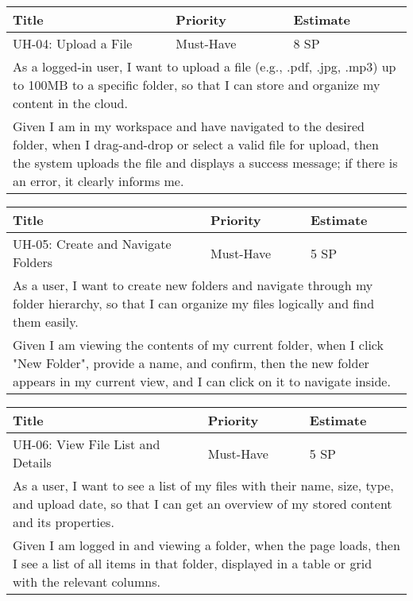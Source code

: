 \vspace{5mm}
\begin{tabular}{|p{4cm}|p{5cm}|p{5cm}|}
    \hline
    \textbf{Title} & \textbf{Priority} & \textbf{Estimate} \\
    \hline
    UH-04: Upload a File & Must-Have & 8 SP \\
    \hline
    \multicolumn{3}{|p{14cm}|}{As a logged-in user, I want to upload a file (e.g., .pdf, .jpg, .mp3) up to 100MB to a specific folder, so that I can store and organize my content in the cloud.} \\
    \hline
    \multicolumn{3}{|p{14cm}|}{Given I am in my workspace and have navigated to the desired folder, when I drag-and-drop or select a valid file for upload, then the system uploads the file and displays a success message; if there is an error, it clearly informs me.} \\
    \hline
\end{tabular}

\vspace{5mm}
\begin{tabular}{|p{4cm}|p{5cm}|p{5cm}|}
    \hline
    \textbf{Title} & \textbf{Priority} & \textbf{Estimate} \\
    \hline
    UH-05: Create and Navigate Folders & Must-Have & 5 SP \\
    \hline
    \multicolumn{3}{|p{14cm}|}{As a user, I want to create new folders and navigate through my folder hierarchy, so that I can organize my files logically and find them easily.} \\
    \hline
    \multicolumn{3}{|p{14cm}|}{Given I am viewing the contents of my current folder, when I click "New Folder", provide a name, and confirm, then the new folder appears in my current view, and I can click on it to navigate inside.} \\
    \hline
\end{tabular}

\vspace{5mm}
\begin{tabular}{|p{4cm}|p{5cm}|p{5cm}|}
    \hline
    \textbf{Title} & \textbf{Priority} & \textbf{Estimate} \\
    \hline
    UH-06: View File List and Details & Must-Have & 5 SP \\
    \hline
    \multicolumn{3}{|p{14cm}|}{As a user, I want to see a list of my files with their name, size, type, and upload date, so that I can get an overview of my stored content and its properties.} \\
    \hline
    \multicolumn{3}{|p{14cm}|}{Given I am logged in and viewing a folder, when the page loads, then I see a list of all items in that folder, displayed in a table or grid with the relevant columns.} \\
    \hline
\end{tabular}

